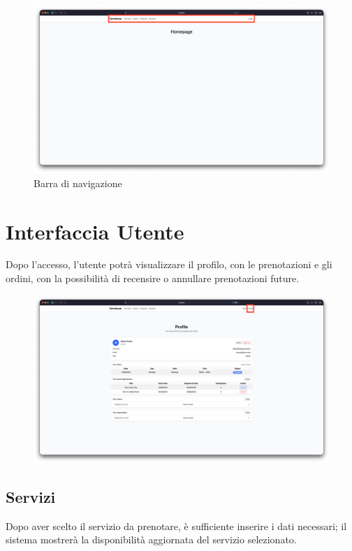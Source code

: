 \documentclass[a4paper,12pt]{report}
\begin{document}
\begin{figure}[H]
    \centering
    \includegraphics[width=\textwidth, trim=0 0 0 0]{./img/users/navbar.png}
    \caption{Barra di navigazione}
    \label{fig:navbar}
\end{figure}

\newpage
\section{Interfaccia Utente}
Dopo l'accesso, l'utente potrà visualizzare il profilo, con le prenotazioni e gli ordini, con 
la possibilità di recensire o annullare prenotazioni future.

\begin{figure}[H]
    \centering
    \includegraphics[width=\textwidth, trim=0 0 0 0]{./img/users/profile.png}
    \vspace{-1em}
    \label{fig:profile}
\end{figure}

\subsection*{Servizi}
Dopo aver scelto il servizio da prenotare, è sufficiente inserire i dati necessari; il sistema 
mostrerà la disponibilità aggiornata del servizio selezionato.
\end{document}
